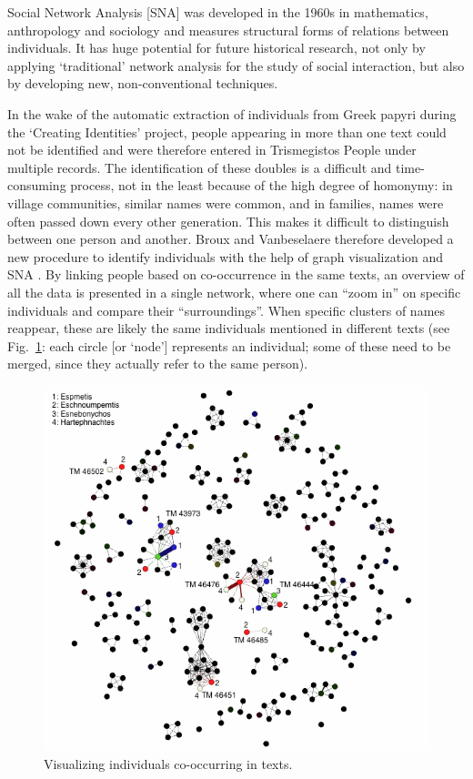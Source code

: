 \documentclass[amsthm,ebook]{saparticle}
\begin{document}
\noindent Social Network Analysis [SNA] was developed in the 1960s in mathematics, anthropology and sociology and measures
structural forms of relations between individuals. It has huge potential for future historical research, not only by
applying `traditional' network analysis for the study of social interaction, but also by developing new,
non-conventional techniques.

In the wake of the automatic extraction of individuals from Greek papyri during the `Creating Identities' project,
people appearing in more than one text could not be identified and were therefore entered in Trismegistos People under
multiple records. The identification of these doubles is a difficult and time-consuming process, not in the least
because of the high degree of homonymy: in village communities, similar names were common, and in families, names were
often passed down every other generation. This makes it difficult to distinguish between one person and another. Broux
and Vanbeselaere therefore developed a new procedure to identify individuals with the help of graph visualization and
SNA \citep{BrouxVanbeselaere}. By linking people based on co-occurrence in the same texts, an overview of
all the data is presented in a single network, where one can ``zoom in'' on specific individuals and compare their
``surroundings''. When specific clusters of names reappear, these are likely the same individuals mentioned in different
texts (see Fig.~\ref{fig:1}: each circle [or `node'] represents an individual; some of these need to be merged, since they
actually refer to the same person). 




\begin{figure}[!bp]
\centering
 \includegraphics[width=\columnwidth]{EAGLE2016FullPaperBroux-img001.jpg}
\caption{Visualizing individuals co-occurring in texts. }
\label{fig:1}
\end{figure}
\end{document}
